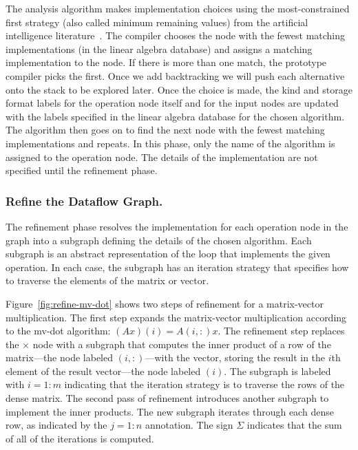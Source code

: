 \documentclass[runningheads]{llncs}
\begin{document}
The analysis algorithm makes implementation choices using the most-constrained first strategy (also called minimum remaining values)
from the artificial intelligence literature~\cite{Russell:2003mz}.
The compiler chooses the node with the fewest matching implementations (in the linear algebra database) and assigns a matching implementation to the node.  If there is more than one match, the prototype compiler picks the first.  Once we add backtracking we will push each alternative onto the stack to be explored later. Once the choice is made, the kind and storage format labels for the operation node itself and for the input nodes are updated with the labels specified in the linear algebra database for the chosen algorithm. The algorithm then goes on to find the next node with the fewest matching implementations and repeats.  In this phase, only the name of the algorithm is assigned to the operation node.  The details of the implementation are not specified until the refinement phase.


\subsubsection{Refine the Dataflow Graph.}
\label{sec:refine}

The refinement phase resolves the implementation for each operation node in the graph into a subgraph defining the details of the chosen algorithm.  Each subgraph is an abstract representation of the loop that implements the given operation.  In each case, the subgraph has an iteration strategy that specifies how to traverse the elements of the matrix or vector.

Figure~\ref{fig:refine-mv-dot} shows two steps of refinement for a matrix-vector multiplication. The first step expands the matrix-vector multiplication according to the mv-dot algorithm: $(Ax)(i) = A(i,:)x$.  The refinement step replaces the $\times$ node with a subgraph that computes the inner product of a row of the matrix---the node labeled $(i,:)$---with the vector, storing the result in the $i$th element of the result vector---the node labeled $(i)$. The subgraph is labeled with $i=1\!:\!m$ indicating that the iteration strategy is to traverse the rows of the dense matrix.
%
The second pass of refinement introduces another subgraph to implement the inner products. The new subgraph iterates through each dense row, as indicated by the $j=1:n$ annotation. The sign $\Sigma$ indicates that the sum of all of the iterations is computed.
\end{document}
